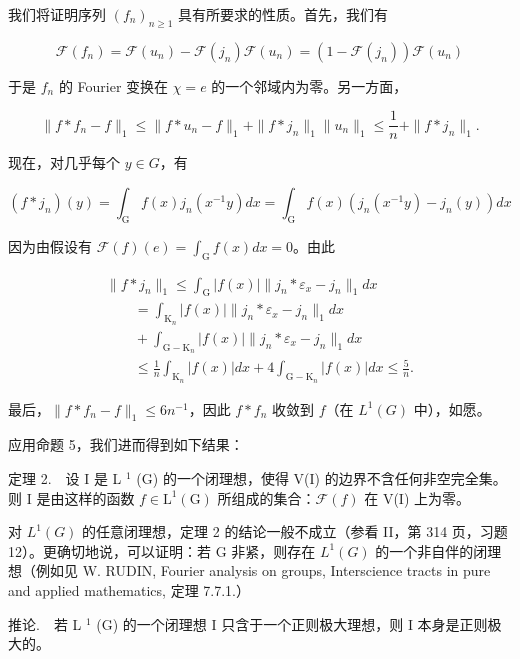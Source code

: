 我们将证明序列 \((f_{n})_{n\geqslant1}\) 具有所要求的性质。首先，我们有

\[
\mathcal {F} (f _ {n}) = \mathcal {F} (u _ {n}) - \mathcal {F} (j _ {n}) \mathcal {F} (u _ {n}) = (1 - \mathcal {F} (j _ {n})) \mathcal {F} (u _ {n})
\]

于是 \(f_{n}\) 的 Fourier 变换在 \(\chi = e\) 的一个邻域内为零。另一方面，

\[
\| f * f _ {n} - f \| _ {1} \leqslant \| f * u _ {n} - f \| _ {1} + \| f * j _ {n} \| _ {1} \| u _ {n} \| _ {1} \leqslant \frac {1}{n} + \| f * j _ {n} \| _ {1}.
\]

现在，对几乎每个 \(y \in G\)，有

\[
(f * j _ {n}) (y) = \int_ {\mathrm{G}} f (x) j _ {n} (x ^ {- 1} y) d x = \int_ {\mathrm{G}} f (x) (j _ {n} (x ^ {- 1} y) - j _ {n} (y)) d x
\]

因为由假设有 \(\mathcal{F}(f)(e) = \int_{\mathrm{G}} f(x) dx = 0\)。由此

\[
\begin{array}{l} \| f * j _ {n} \| _ {1} \leqslant \int_ {\mathrm{G}} | f (x) | \| j _ {n} * \varepsilon_ {x} - j _ {n} \| _ {1} d x \\ \qquad = \int_ {\mathrm{K} _ {n}} | f (x) | \| j _ {n} * \varepsilon_ {x} - j _ {n} \| _ {1} d x \\ \qquad + \int_ {\mathrm{G-K} _ {n}} | f (x) | \| j _ {n} * \varepsilon_ {x} - j _ {n} \| _ {1} d x \\ \qquad \leqslant \frac {1}{n} \int_ {\mathrm{K} _ {n}} | f (x) | d x + 4 \int_ {\mathrm{G-K} _ {n}} | f (x) | d x \leqslant \frac {5}{n}. \end{array}
\]

最后，\(\|f * f_{n} - f\|_{1} \leqslant 6n^{-1}\)，因此 \(f * f_{n}\) 收敛到 \(f\)（在 \(L^{1}(G)\) 中），如愿。

应用命题 5，我们进而得到如下结果：

定理 2.　设 I 是 L \(^{1}\) (G) 的一个闭理想，使得 V(I) 的边界不含任何非空完全集。则 I 是由这样的函数 \(f \in \text{L}^{1}(\text{G})\) 所组成的集合：\(\mathcal{F}(f)\) 在 V(I) 上为零。

对 \(L^{1}(G)\) 的任意闭理想，定理 2 的结论一般不成立（参看 II，第 314 页，习题 12）。更确切地说，可以证明：若 G 非紧，则存在 \(L^{1}(G)\) 的一个非自伴的闭理想（例如见 W. RUDIN, Fourier analysis on groups, Interscience tracts in pure and applied mathematics, 定理 7.7.1.）

推论.　若 L \(^{1}\) (G) 的一个闭理想 I 只含于一个正则极大理想，则 I 本身是正则极大的。

